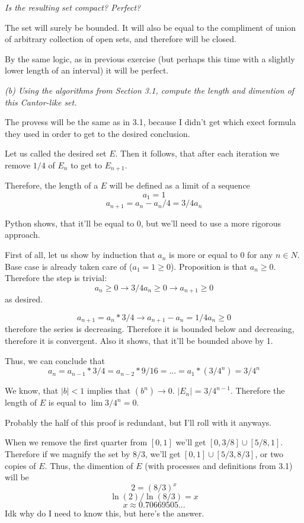 \documentclass[11pt,oneside,titlepage]{book}
\begin{document}
\textit{Is the resulting set compact? Perfect?}

The set will surely be bounded. It will also be equal to the compliment
of union of arbitrary collection of open sets, and therefore will be closed.

By the same logic, as in previous exercise (but perhaps this time with a
slightly lower length of an interval) it will be perfect.

\textit{(b) Using the algorithms from Section 3.1, compute the length and
  dimention of this Cantor-like set.}

The provess will be the same as in 3.1, because I didn't get which
exect formula they used in order to get to the desired conclusion.

Let us called the desired set $E$. Then it follows, that after each iteration
we remove $1/4$ of $E_n$ to get to $E_{n + 1}$.


Therefore, the length of a $E$ will be defined as a limit of
a sequence
$$a_1 = 1$$
$$a_{n + 1} = a_n - a_n/4 = 3/4 a_n$$

Python shows, that it'll be equal to 0, but we'll need to use
a more rigorous approach.

First of all, let us show by induction that $a_n$ is more or equal to $0$
for any $n \in N$. Base case is already taken care of ($a_1  = 1\geq 0$).
Proposition is that $a_n \geq 0$. Therefore the step is trivial:
$$a_n \geq 0 \to 3/4 a_n \geq 0 \to a_{n + 1} \geq 0$$
as desired.

$$a_{n + 1} = a_n * 3/4 \to a_{n + 1} - a_n = 1/4 a_n \geq 0$$
therefore the series is decreasing. Therefore it is bounded below and
decreasing, therefore it is convergent. Also it shows, that it'll be bounded
above by 1.

Thus, we can conclude that
$$a_n = a_{n - 1} * 3/4 = a_{n - 2} * 9/16 = ... = a_1 * (3/4^n) = 3/4^n$$

We know, that $|b| < 1 $ implies that $ (b^n) \to 0$. $|E_n|$ =
$3/4^{n - 1}$. Therefore the length of $E$ is equal to $\lim 3/4^n = 0$.

Probably the half of this proof is redundant, but I'll roll with it anyways.

When we remove the first quarter from $[0, 1]$ we'll get
$[0, 3/8] \cup [5/8, 1]$. Therefore if we magnify the set by $8/3$, we'll get
$[0, 1] \cup [5/3, 8/3]$, or two copies of $E$. Thus, the dimention of $E$
(with processes and definitions from 3.1) will be
$$2 = (8/3)^x$$
$$\ln{(2)} / \ln{(8/3)} = x$$
$$x \approx 0.70669505...$$
Idk why do I need to know this, but here's the answer.
\end{document}
